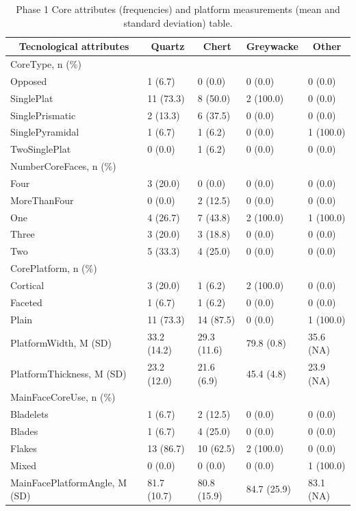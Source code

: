 \documentclass[12pt,twoside]{reedthesis}
\begin{document}
\begin{longtable}[t]{lllll}
\caption{\label{tab:unnamed-chunk-58}Phase 1 Core attributes (frequencies) and platform measurements (mean and standard deviation) table.}\\
\toprule
\multicolumn{1}{c}{\textbf{Tecnological attributes}} & \multicolumn{1}{c}{\textbf{Quartz}} & \multicolumn{1}{c}{\textbf{Chert}} & \multicolumn{1}{c}{\textbf{Greywacke}} & \multicolumn{1}{c}{\textbf{Other}}\\
\midrule
CoreType, n (\%) &  &  &  & \\
Opposed & 1 (6.7) & 0 (0.0) & 0 (0.0) & 0 (0.0)\\
SinglePlat & 11 (73.3) & 8 (50.0) & 2 (100.0) & 0 (0.0)\\
SinglePrismatic & 2 (13.3) & 6 (37.5) & 0 (0.0) & 0 (0.0)\\
SinglePyramidal & 1 (6.7) & 1 (6.2) & 0 (0.0) & 1 (100.0)\\
\addlinespace
TwoSinglePlat & 0 (0.0) & 1 (6.2) & 0 (0.0) & 0 (0.0)\\
NumberCoreFaces, n (\%) &  &  &  & \\
Four & 3 (20.0) & 0 (0.0) & 0 (0.0) & 0 (0.0)\\
MoreThanFour & 0 (0.0) & 2 (12.5) & 0 (0.0) & 0 (0.0)\\
One & 4 (26.7) & 7 (43.8) & 2 (100.0) & 1 (100.0)\\
\addlinespace
Three & 3 (20.0) & 3 (18.8) & 0 (0.0) & 0 (0.0)\\
Two & 5 (33.3) & 4 (25.0) & 0 (0.0) & 0 (0.0)\\
CorePlatform, n (\%) &  &  &  & \\
Cortical & 3 (20.0) & 1 (6.2) & 2 (100.0) & 0 (0.0)\\
Faceted & 1 (6.7) & 1 (6.2) & 0 (0.0) & 0 (0.0)\\
\addlinespace
Plain & 11 (73.3) & 14 (87.5) & 0 (0.0) & 1 (100.0)\\
PlatformWidth, M (SD) & 33.2 (14.2) & 29.3 (11.6) & 79.8 (0.8) & 35.6 (NA)\\
PlatformThickness, M (SD) & 23.2 (12.0) & 21.6 (6.9) & 45.4 (4.8) & 23.9 (NA)\\
MainFaceCoreUse, n (\%) &  &  &  & \\
Bladelets & 1 (6.7) & 2 (12.5) & 0 (0.0) & 0 (0.0)\\
\addlinespace
Blades & 1 (6.7) & 4 (25.0) & 0 (0.0) & 0 (0.0)\\
Flakes & 13 (86.7) & 10 (62.5) & 2 (100.0) & 0 (0.0)\\
Mixed & 0 (0.0) & 0 (0.0) & 0 (0.0) & 1 (100.0)\\
MainFacePlatformAngle, M (SD) & 81.7 (10.7) & 80.8 (15.9) & 84.7 (25.9) & 83.1 (NA)\\
\bottomrule
\end{longtable}
\end{document}
